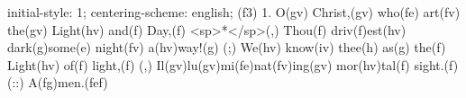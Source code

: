 initial-style: 1;
centering-scheme: english;
(f3) 1. O(gv) Christ,(gv) who(fe) art(fv) the(gv) Light(hv) and(f) Day,(f) <sp>*</sp>(,)
Thou(f) driv(f)est(hv) dark(g)some(e) night(fv) a(hv)way!(g) (;)
We(hv) know(iv) thee(h) as(g) the(f) Light(hv) of(f) light,(f) (,)
Il(gv)lu(gv)mi(fe)nat(fv)ing(gv) mor(hv)tal(f) sight.(f) (::) A(fg)men.(fef)
